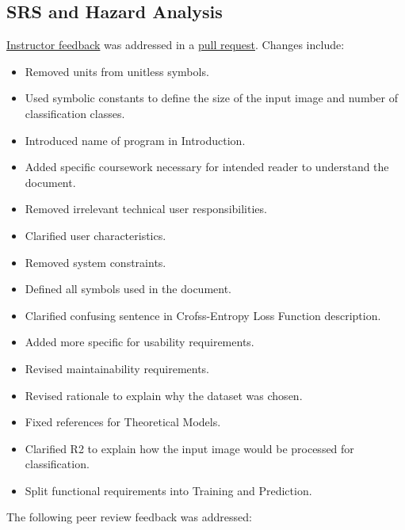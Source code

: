 \documentclass{article}
\begin{document}

\subsection{SRS and Hazard Analysis}

\href{https://github.com/ptrandev/OCRacle/issues/3}{Instructor feedback} was addressed in
a \href{https://github.com/ptrandev/OCRacle/pull/29}{pull request}. Changes include:

\begin{itemize}
  \item Removed units from unitless symbols.
  \item Used symbolic constants to define the size of the input image and number of classification classes.
  \item Introduced name of program in Introduction.
  \item Added specific coursework necessary for intended reader to understand the document.
  \item Removed irrelevant technical user responsibilities.
  \item Clarified user characteristics.
  \item Removed system constraints.
  \item Defined all symbols used in the document.
  \item Clarified confusing sentence in Crofss-Entropy Loss Function description.
  \item Added more specific for usability requirements.
  \item Revised maintainability requirements.
  \item Revised rationale to explain why the dataset was chosen.
  \item Fixed references for Theoretical Models.
  \item Clarified R2 to explain how the input image would be processed for classification.
  \item Split functional requirements into Training and Prediction.
\end{itemize}

\noindent The following peer review feedback was addressed:
\end{document}
